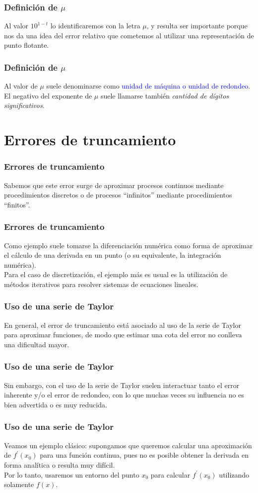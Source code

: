 \begin{frame}
\frametitle{Definición de $\mu$}
Al valor $10^{1-t}$ lo identificaremos con la letra $\mu$, y resulta ser importante porque nos da
una idea del error relativo que cometemos al utilizar una representación de punto flotante.
\end{frame}
\begin{frame}
\frametitle{Definición de $\mu$}
Al valor de $\mu$ suele denominarse como \textcolor{blue}{unidad de máquina o unidad de redondeo}. 
\\
\bigskip
El negativo del exponente de $\mu$ suele llamarse también \textit{cantidad de dígitos significativos}.
\end{frame}
\section{Errores de truncamiento}
\begin{frame}
\frametitle{Errores de truncamiento}
Sabemos que este error surge de aproximar procesos continuos mediante procedimientos discretos o
de procesos \enquote{infinitos} mediante procedimientos \enquote{finitos}.
\end{frame}
\begin{frame}
\frametitle{Errores de truncamiento}
Como ejemplo suele tomarse la diferenciación numérica como forma de aproximar el cálculo de una derivada en un punto (o su equivalente, la integración numérica).
\\
\bigskip
\pause
Para el caso de discretización, el ejemplo más es usual es la utilización de métodos iterativos para resolver sistemas de ecuaciones lineales.
\end{frame}
\begin{frame}
\frametitle{Uso de una serie de Taylor}
En general, el error de truncamiento está asociado al uso de la serie de Taylor para aproximar funciones, de modo que estimar una cota del error no conlleva una dificultad mayor.
\end{frame}
\begin{frame}
\frametitle{Uso de una serie de Taylor}
Sin embargo, con el uso de la serie de Taylor suelen interactuar tanto el error inherente y/o el error de redondeo, con lo que muchas veces su influencia no es bien advertida o es muy reducida. 
\end{frame}
\begin{frame}
\frametitle{Uso de una serie de Taylor}
Veamos un ejemplo clásico: supongamos que queremos calcular una aproximación de $f^{\prime}(x_{0})$ para una función continua, pues no es posible obtener la derivada en forma analítica o resulta muy difícil.
\\
\bigskip
\pause
Por lo tanto, usaremos un entorno del punto $x_{0}$ para calcular $f^{\prime}(x_{0})$ utilizando solamente $f(x)$.
\end{frame}
